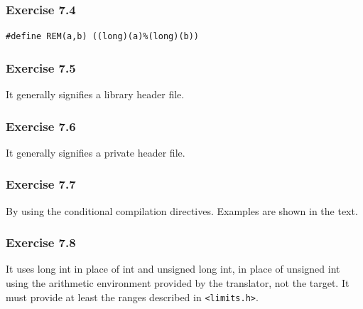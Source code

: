   

  \subsubsection*{Exercise 7.4}

   \begin{Verbatim}
#define REM(a,b) ((long)(a)%(long)(b))
\end{Verbatim}

  

  \subsubsection*{Exercise 7.5}

   It generally signifies a library header file.


  

  \subsubsection*{Exercise 7.6}

   It generally signifies a private header file.


  

  \subsubsection*{Exercise 7.7}

   By using the conditional compilation directives. Examples are shown in
    the text.


  

  \subsubsection*{Exercise 7.8}

   It uses long int in place of int and unsigned long int, in place of
    unsigned int using the arithmetic environment provided by the translator,
    not the target. It must provide at least the ranges described in
    \texttt{<limits.h>}.


  

 

